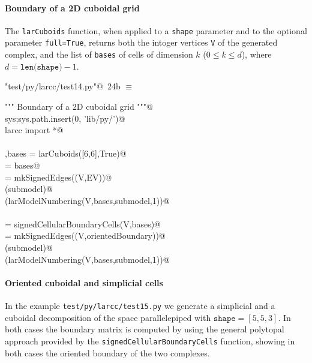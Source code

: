 \documentclass[11pt,oneside]{article}	%
\begin{document}
\paragraph{Boundary of a 2D cuboidal grid}
The \texttt{larCuboids} function, when applied to a \texttt{shape} parameter and to the optional parameter \texttt{full=True}, returns both the intoger vertices \texttt{V} of the generated complex, and the list of \texttt{bases} of cells of dimension $k$ ($0\leq k\leq d$), where $d = \texttt{len(shape)}-1$.

\begin{flushleft} \small \label{scrap42}
\protect{}\verb@"test/py/larcc/test14.py"@\nobreak\ {\footnotesize 24b }$\equiv$
\vspace{-1ex}
\begin{list}{}{} \item
\mbox{}\verb@""" Boundary of a 2D cuboidal grid """@\\
\mbox{}\verb@import sys;sys.path.insert(0, 'lib/py/')@\\
\mbox{}\verb@from larcc import *@\\
\mbox{}\verb@@\\
\mbox{}\verb@V,bases = larCuboids([6,6],True)@\\
\mbox{}\verb@[VV,EV,FV] = bases@\\
\mbox{}\verb@submodel = mkSignedEdges((V,EV))@\\
\mbox{}\verb@VIEW(submodel)@\\
\mbox{}\verb@VIEW(larModelNumbering(V,bases,submodel,1))@\\
\mbox{}\verb@@\\
\mbox{}\verb@orientedBoundary = signedCellularBoundaryCells(V,bases)@\\
\mbox{}\verb@submodel = mkSignedEdges((V,orientedBoundary))@\\
\mbox{}\verb@VIEW(submodel)@\\
\mbox{}\verb@VIEW(larModelNumbering(V,bases,submodel,1))@\\
\mbox{}\verb@@{\NWsep}
\end{list}
\vspace{-2ex}
\end{flushleft}

\paragraph{Oriented cuboidal and simplicial cells}
In the example \texttt{test/py/larcc/test15.py} we generate a simplicial and a cuboidal decomposition of the space parallelepiped with $\texttt{shape}=[5,5,3]$.
In both cases the boundary matrix is computed by using the general polytopal approach provided by the \texttt{signedCellularBoundaryCells} function, showing in both cases the oriented boundary of the two complexes.
\end{document}
